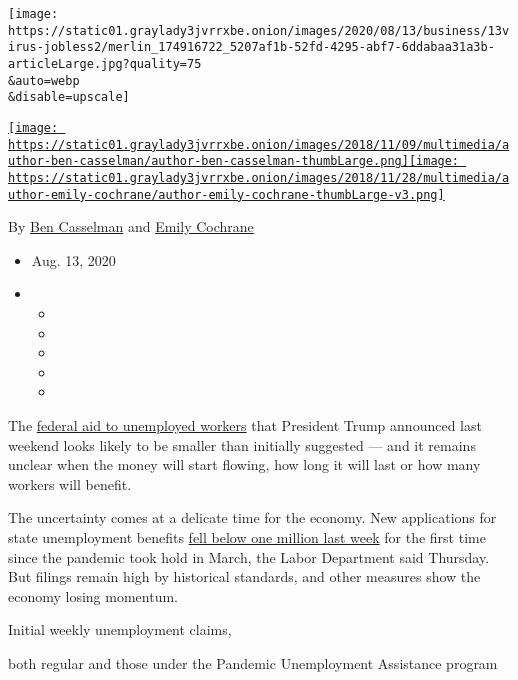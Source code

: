 \texttt{[image: https://static01.graylady3jvrrxbe.onion/images/2020/08/13/business/13virus-jobless2/merlin\_174916722\_5207af1b-52fd-4295-abf7-6ddabaa31a3b-articleLarge.jpg?quality=75\\\&auto=webp\\\&disable=upscale]}

\href{https://www.nytimes3xbfgragh.onion/by/ben-casselman}{\texttt{[image: https://static01.graylady3jvrrxbe.onion/images/2018/11/09/multimedia/author-ben-casselman/author-ben-casselman-thumbLarge.png]}}\href{https://www.nytimes3xbfgragh.onion/by/emily-cochrane}{\texttt{[image: https://static01.graylady3jvrrxbe.onion/images/2018/11/28/multimedia/author-emily-cochrane/author-emily-cochrane-thumbLarge-v3.png]}}

By \href{https://www.nytimes3xbfgragh.onion/by/ben-casselman}{Ben
Casselman} and
\href{https://www.nytimes3xbfgragh.onion/by/emily-cochrane}{Emily
Cochrane}

\begin{itemize}
\item
  Aug. 13, 2020
\item
  \begin{itemize}
  \item
  \item
  \item
  \item
  \item
  \end{itemize}
\end{itemize}

The
\href{https://www.nytimes3xbfgragh.onion/2020/08/08/us/politics/trump-stimulus-bill-coronavirus.html}{federal
aid to unemployed workers} that President Trump announced last weekend
looks likely to be smaller than initially suggested --- and it remains
unclear when the money will start flowing, how long it will last or how
many workers will benefit.

The uncertainty comes at a delicate time for the economy. New
applications for state unemployment benefits
\href{https://www.nytimes3xbfgragh.onion/live/2020/08/13/business/stock-market-today-coronavirus/963000-filed-state-unemployment-claims-last-week-but-layoffs-remained-high}{fell
below one million last week} for the first time since the pandemic took
hold in March, the Labor Department said Thursday. But filings remain
high by historical standards, and other measures show the economy losing
momentum.

Initial weekly unemployment claims,

both regular and those under the Pandemic Unemployment Assistance
program

